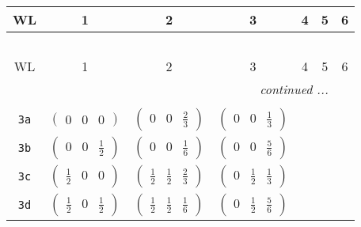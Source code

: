 \documentclass[fleqn,9pt,landscape]{jsarticle}
\begin{document}
\begin{center}
\renewcommand{\arraystretch}{1.2}
\begin{longtable}{ccccccc}
 \hline \hline
WL & 1 & 2 & 3 & 4 & 5 & 6 \\ \hline \endfirsthead

\multicolumn{6}{l}{\tablename\ \thetable{}} \\
 \hline \hline
WL & 1 & 2 & 3 & 4 & 5 & 6 \\ \hline \endhead

 \hline \hline
\multicolumn{6}{r}{\footnotesize\it continued ...} \\ \endfoot

 \hline \hline
\multicolumn{6}{r}{} \\ \endlastfoot

{\tt 3a} & $ \begin{pmatrix} 0 & 0 & 0 \end{pmatrix} $ & $ \begin{pmatrix} 0 & 0 & \frac{2}{3} \end{pmatrix} $ & $ \begin{pmatrix} 0 & 0 & \frac{1}{3} \end{pmatrix} $ & $  $ & $  $ & $  $ \\ \hline
{\tt 3b} & $ \begin{pmatrix} 0 & 0 & \frac{1}{2} \end{pmatrix} $ & $ \begin{pmatrix} 0 & 0 & \frac{1}{6} \end{pmatrix} $ & $ \begin{pmatrix} 0 & 0 & \frac{5}{6} \end{pmatrix} $ & $  $ & $  $ & $  $ \\ \hline
{\tt 3c} & $ \begin{pmatrix} \frac{1}{2} & 0 & 0 \end{pmatrix} $ & $ \begin{pmatrix} \frac{1}{2} & \frac{1}{2} & \frac{2}{3} \end{pmatrix} $ & $ \begin{pmatrix} 0 & \frac{1}{2} & \frac{1}{3} \end{pmatrix} $ & $  $ & $  $ & $  $ \\ \hline
{\tt 3d} & $ \begin{pmatrix} \frac{1}{2} & 0 & \frac{1}{2} \end{pmatrix} $ & $ \begin{pmatrix} \frac{1}{2} & \frac{1}{2} & \frac{1}{6} \end{pmatrix} $ & $ \begin{pmatrix} 0 & \frac{1}{2} & \frac{5}{6} \end{pmatrix} $ & $  $ & $  $ & $  $ \\ \hline

\end{longtable}
\end{center}
\end{document}

